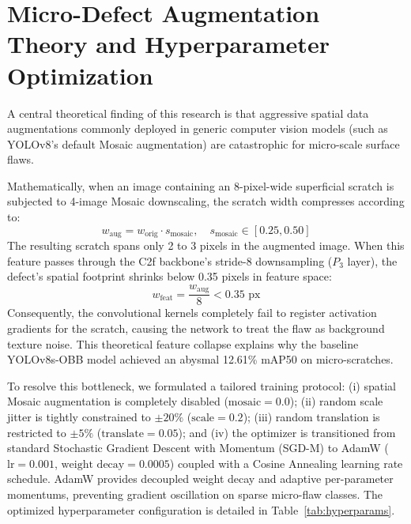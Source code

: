 \section{Micro-Defect Augmentation Theory and Hyperparameter Optimization}
\label{sec:aug_theory}

A central theoretical finding of this research is that aggressive spatial data augmentations commonly deployed in generic computer vision models (such as YOLOv8's default Mosaic augmentation) are catastrophic for micro-scale surface flaws.

Mathematically, when an image containing an 8-pixel-wide superficial scratch is subjected to 4-image Mosaic downscaling, the scratch width compresses according to:
\begin{equation}
w_{\text{aug}} = w_{\text{orig}} \cdot s_{\text{mosaic}}, \quad s_{\text{mosaic}} \in [0.25, 0.50]
\end{equation}
The resulting scratch spans only 2 to 3 pixels in the augmented image. When this feature passes through the C2f backbone's stride-8 downsampling ($P_3$ layer), the defect's spatial footprint shrinks below 0.35 pixels in feature space:
\begin{equation}
w_{\text{feat}} = \frac{w_{\text{aug}}}{8} < 0.35\text{ px}
\end{equation}
Consequently, the convolutional kernels completely fail to register activation gradients for the scratch, causing the network to treat the flaw as background texture noise. This theoretical feature collapse explains why the baseline YOLOv8s-OBB model achieved an abysmal 12.61\% mAP50 on micro-scratches.

To resolve this bottleneck, we formulated a tailored training protocol: (i) spatial Mosaic augmentation is completely disabled ($\text{mosaic} = 0.0$); (ii) random scale jitter is tightly constrained to $\pm 20\%$ ($\text{scale} = 0.2$); (iii) random translation is restricted to $\pm 5\%$ ($\text{translate} = 0.05$); and (iv) the optimizer is transitioned from standard Stochastic Gradient Descent with Momentum (SGD-M) to AdamW ($\text{lr} = 0.001$, $\text{weight decay} = 0.0005$) coupled with a Cosine Annealing learning rate schedule. AdamW provides decoupled weight decay and adaptive per-parameter momentums, preventing gradient oscillation on sparse micro-flaw classes. The optimized hyperparameter configuration is detailed in Table~\ref{tab:hyperparams}.

